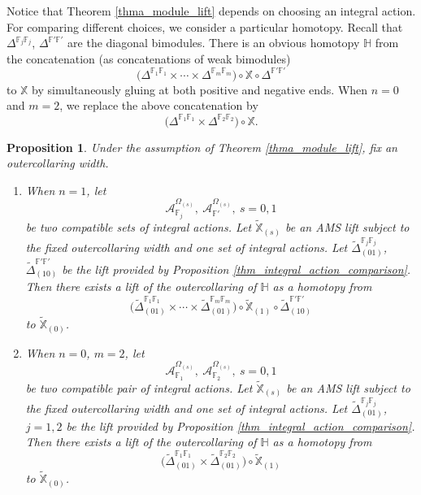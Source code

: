 \documentclass[reqno, 10pt]{amsart}
\numberwithin{equation}{section}
\numberwithin{equation}{section}
\newtheorem{prop}[thm]{Proposition}
\theoremstyle{definition}
\theoremstyle{remark}
\newcommand{\beqn}{\begin{equation*}}
\newcommand{\eeqn}{\end{equation*}}
\newcommand{\mb}{\mathbb}
\newcommand{\mc}{\mathcal}
\begin{document}
Notice that Theorem \ref{thma_module_lift} depends on choosing an integral action. For comparing different choices, we consider a particular homotopy. Recall that $\mb{\Delta}^{{\mb F}_j\mb{F}_j}$, $\mb{\Delta}^{{\mb F}'{\mb F}'}$ are the diagonal bimodules. There is an obvious homotopy ${\mb H}$ from the concatenation (as concatenations of weak bimodules)
\beqn
\Big( \mb{\Delta}^{\mb{F}_1\mb{F}_1} \times \cdots \times \mb{\Delta}^{\mb{F}_m\mb{F}_m} \Big) \circ \mb{X} \circ \mb{\Delta}^{{\mb F}'\mb{F}'}
\eeqn
to ${\mb X}$ by simultaneously gluing at both positive and negative ends. When $n=0$ and $m=2$, we replace the above concatenation by
\beqn
\Big( \mb{\Delta}^{\mb{F}_1\mb{F}_1} \times \mb{\Delta}^{\mb{F}_2\mb{F}_2} \Big) \circ \mb{X}.
\eeqn

\begin{prop}\label{prop:module-double}
Under the assumption of Theorem \ref{thma_module_lift}, fix an outercollaring width. 

\begin{enumerate}

\item When $n = 1$, let
\beqn
{\mc A}_{\mb{F}_j}^{\Omega_{(s)}},\ {\mc A}_{{\mb F}'}^{\Omega_{(s)}},\ s = 0, 1
\eeqn
be two compatible sets of integral actions. Let $\tilde{\mb{X}}_{(s)}$ be an AMS lift subject to the fixed outercollaring width and one set of integral actions. Let $\tilde{\mb{\Delta}}_{(01)}^{\mb{F}_j\mb{F}_j}$, $\tilde{\mb{\Delta}}_{(10)}^{\mb{F}'\mb{F}'}$ be the lift provided by Proposition \ref{thm_integral_action_comparison}. Then there exists a lift of the outercollaring of ${\mb H}$ as a homotopy from 
\beqn
\Big( \tilde{\mb{\Delta}}_{(01)}^{\mb{F}_1\mb{F}_1} \times \cdots \times \tilde{\mb{\Delta}}_{(01)}^{\mb{F}_m\mb{F}_m} \Big) \circ \tilde{\mb X}_{(1)}  \circ \tilde{\mb{\Delta}}_{(10)}^{{\mb F}'\mb{F}'}
\eeqn
to $\tilde {\mb X}_{(0)}$.

\item When $n = 0$, $m = 2$, let 
\beqn
{\mc A}_{{\mb F}_1}^{\Omega_{(s)}},\ {\mc A}_{{\mb F}_2}^{\Omega_{(s)}},\ s = 0, 1
\eeqn
be two compatible pair of integral actions. Let $\tilde{\mb{X}}_{(s)}$ be an AMS lift subject to the fixed outercollaring width and one set of integral actions. Let $\tilde{\mb{\Delta}}_{(01)}^{\mb{F}_j\mb{F}_j}$, $j = 1, 2$ be the lift provided by Proposition \ref{thm_integral_action_comparison}. Then there exists a lift of the outercollaring of ${\mb H}$ as a homotopy from 
\beqn
\Big( \tilde{\mb{\Delta}}_{(01)}^{\mb{F}_1\mb{F}_1} \times \tilde{\mb{\Delta}}_{(01)}^{\mb{F}_2\mb{F}_2} \Big) \circ \tilde{\mb X}_{(1)}  
\eeqn
to $\tilde {\mb X}_{(0)}$.

\end{enumerate}
\end{prop}
\end{document}
